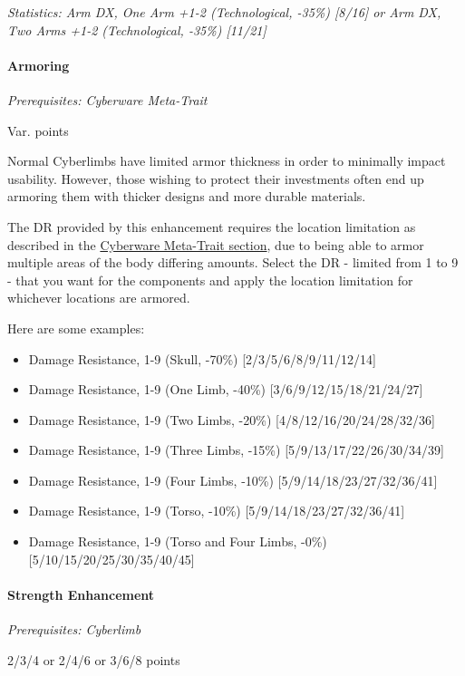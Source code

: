 \begin{multicols*}{3}
	\textit{\textcolor{OliveGreen}{Statistics: Arm DX, One Arm +1-2 (Technological, -35\%) [8/16] or Arm DX, Two Arms +1-2 (Technological, -35\%) [11/21]}}
	
	\paragraph{Armoring}
	\textit{Prerequisites: Cyberware Meta-Trait}
	\begin{flushright}
		Var. points
	\end{flushright}
	
	Normal Cyberlimbs have limited armor thickness in order to minimally impact usability. However, those wishing to protect their investments often end up armoring them with thicker designs and more durable materials.
	
	The DR provided by this enhancement requires the location limitation as described in the \hyperref[cyberware-meta-trait]{Cyberware Meta-Trait section}, due to being able to armor multiple areas of the body differing amounts. Select the DR - limited from 1 to 9 - that you want for the components and apply the location limitation for whichever locations are armored.
	
	Here are some examples:
	
	\begin{itemize}
		\itemsep0em 
		\item Damage Resistance, 1-9 (Skull, -70\%) [2/3/5/6/8/9/11/12/14]
		\item Damage Resistance, 1-9 (One Limb, -40\%) [3/6/9/12/15/18/21/24/27]
		\item Damage Resistance, 1-9 (Two Limbs, -20\%) [4/8/12/16/20/24/28/32/36]
		\item Damage Resistance, 1-9 (Three Limbs, -15\%) [5/9/13/17/22/26/30/34/39]
		\item Damage Resistance, 1-9 (Four Limbs, -10\%) [5/9/14/18/23/27/32/36/41]
		\item Damage Resistance, 1-9 (Torso, -10\%) [5/9/14/18/23/27/32/36/41]
		\item Damage Resistance, 1-9 (Torso and Four Limbs, -0\%) [5/10/15/20/25/30/35/40/45]
	\end{itemize}
	
	\paragraph{Strength Enhancement}
	\textit{Prerequisites: Cyberlimb}
	\begin{flushright}
		2/3/4 or 2/4/6 or 3/6/8 points
	\end{flushright}


\end{multicols*}
